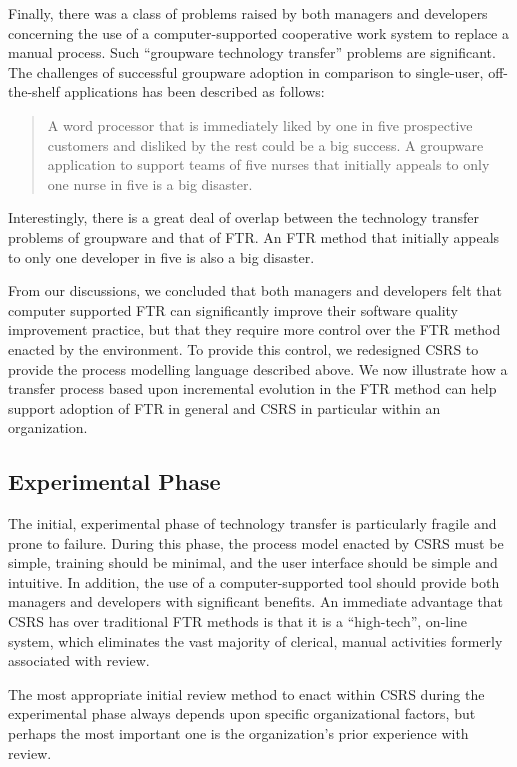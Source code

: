 Finally, there was a class of problems raised by both managers and
developers concerning the use of a computer-supported cooperative work
system to replace a manual process.  Such ``groupware technology transfer''
problems are significant.  The challenges of successful groupware adoption
in comparison to single-user, off-the-shelf applications has been described
as follows:
\begin{quotation}
A word processor that is immediately liked by one in five prospective
customers and disliked by the rest could be a big success.  A groupware
application to support teams of five nurses that initially appeals to only
one nurse in five is a big disaster.  \cite{Grudin94}
\end{quotation}
Interestingly, there is a great deal of overlap between the technology
transfer problems of groupware and that of FTR. An FTR method that
initially appeals to only one developer in five is also a big
disaster. 

From our discussions, we concluded that both managers and developers felt
that computer supported FTR can significantly improve their software
quality improvement practice, but that they require more control over the
FTR method enacted by the environment.  To provide this control, we
redesigned CSRS to provide the process modelling language described above.
We now illustrate how a transfer process based upon incremental evolution
in the FTR method can help support adoption of FTR in general and CSRS in
particular within an organization.  


\subsection{Experimental Phase}

The initial, experimental phase of technology transfer is particularly
fragile and prone to failure.  During this phase, the process model enacted
by CSRS must be simple, training should be minimal, and the user interface
should be simple and intuitive.  In addition, the use of a
computer-supported tool should provide both managers and developers with
significant benefits.  An immediate advantage that CSRS has over
traditional FTR methods is that it is a ``high-tech'', on-line system,
which eliminates the vast majority of clerical, manual activities formerly
associated with review.

The most appropriate initial review method to enact within CSRS during the
experimental phase always depends upon specific organizational factors, but
perhaps the most important one is the organization's prior experience with
review. 

